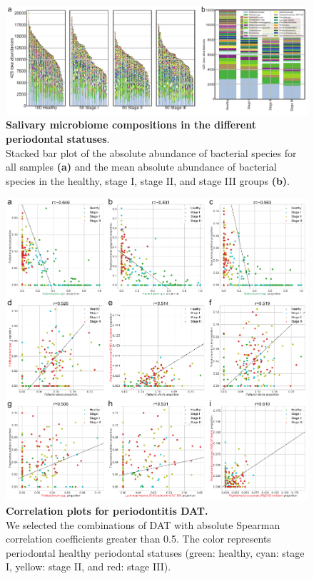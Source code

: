 \documentclass[11pt, a4paper, onecolumn, oneside]{report}
\begin{document}
            \begin{figure}[p]
                \centering
                \includegraphics[width=\linewidth]{Figures/Periodontitis/Figure_S2.pdf}
                \caption[Salivary microbiome compositions in the different periodontal statuses]{\textbf{Salivary microbiome compositions in the different periodontal statuses}. \\
                    Stacked bar plot of the absolute abundance of bacterial species for all samples \textbf{(a)} and the mean absolute abundance of bacterial species in the healthy, stage I, stage II, and stage III groups \textbf{(b)}.}
                \label{fig:Periodontitis-abundance}
            \end{figure}
            \clearpage

            \begin{figure}[p]
                \centering
                \includegraphics[width=\linewidth]{Figures/Periodontitis/Figure_S3.pdf}
                \caption[Correlation plots for periodontitis DAT]{\textbf{Correlation plots for periodontitis DAT.}\\
                    We selected the combinations of DAT with absolute Spearman correlation coefficients greater than 0.5. The color represents periodontal healthy periodontal statuses (green: healthy, cyan: stage I, yellow: stage II, and red: stage III).}
                \label{fig:Periodontitis-correlation2}
            \end{figure}
            \clearpage
\end{document}
